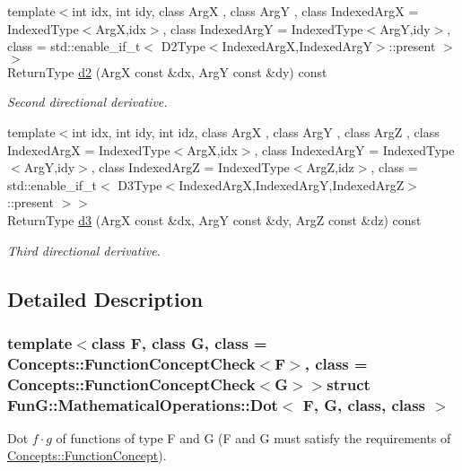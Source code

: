\begin{DoxyCompactItemize}
{\footnotesize template$<$int idx, int idy, class Arg\-X , class Arg\-Y , class Indexed\-Arg\-X  = \-Indexed\-Type$<$\-Arg\-X,idx$>$, class Indexed\-Arg\-Y  = \-Indexed\-Type$<$\-Arg\-Y,idy$>$, class  = std\-::enable\-\_\-if\-\_\-t$<$ D2\-Type$<$\-Indexed\-Arg\-X,\-Indexed\-Arg\-Y$>$\-::present $>$$>$ }\\\-Return\-Type \hyperlink{structFunG_1_1MathematicalOperations_1_1Dot_a1f6635249552959c216f3f15f5fc0037}{d2} (\-Arg\-X const \&dx, \-Arg\-Y const \&dy) const 
\begin{DoxyCompactList}\small\item\em \-Second directional derivative. \end{DoxyCompactList}\item 
{\footnotesize template$<$int idx, int idy, int idz, class Arg\-X , class Arg\-Y , class Arg\-Z , class Indexed\-Arg\-X  = \-Indexed\-Type$<$\-Arg\-X,idx$>$, class Indexed\-Arg\-Y  = \-Indexed\-Type$<$\-Arg\-Y,idy$>$, class Indexed\-Arg\-Z  = \-Indexed\-Type$<$\-Arg\-Z,idz$>$, class  = std\-::enable\-\_\-if\-\_\-t$<$ D3\-Type$<$\-Indexed\-Arg\-X,\-Indexed\-Arg\-Y,\-Indexed\-Arg\-Z$>$\-::present $>$$>$ }\\\-Return\-Type \hyperlink{structFunG_1_1MathematicalOperations_1_1Dot_a1fe7dc4596f532e9568e48945c07d00b}{d3} (\-Arg\-X const \&dx, \-Arg\-Y const \&dy, \-Arg\-Z const \&dz) const 
\begin{DoxyCompactList}\small\item\em \-Third directional derivative. \end{DoxyCompactList}\end{DoxyCompactItemize}


\subsection{\-Detailed \-Description}
\subsubsection*{template$<$class F, class G, class = \-Concepts\-::\-Function\-Concept\-Check$<$\-F$>$, class = \-Concepts\-::\-Function\-Concept\-Check$<$\-G$>$$>$struct Fun\-G\-::\-Mathematical\-Operations\-::\-Dot$<$ F, G, class, class $>$}

\-Dot $f \cdot g$ of functions of type \-F and \-G (\-F and \-G must satisfy the requirements of \hyperlink{structFunG_1_1Concepts_1_1FunctionConcept}{\-Concepts\-::\-Function\-Concept}). 

